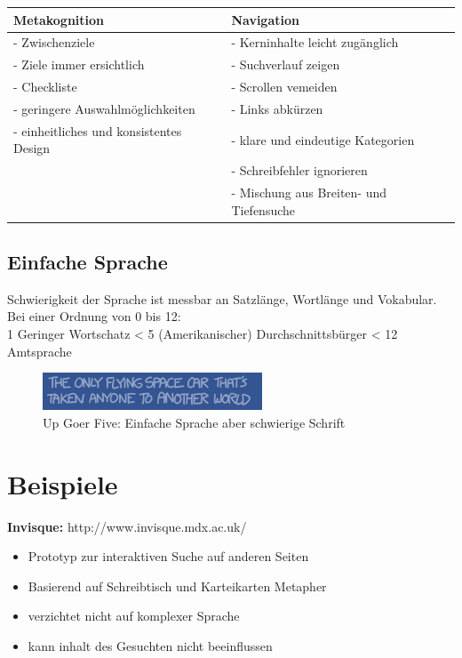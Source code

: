 \documentclass{handout}
\begin{document}
\begin{tabular}{| l | l |}
\hline
 Metakognition & Navigation\\
\hline
\hline
- Zwischenziele                        & - Kerninhalte leicht zugänglich\\
- Ziele immer ersichtlich &  - Suchverlauf zeigen\\
- Checkliste                     & - Scrollen vemeiden\\
 - geringere Auswahlmöglichkeiten& - Links abkürzen \\
 - einheitliches und konsistentes Design&  - klare und eindeutige Kategorien \\
& - Schreibfehler ignorieren \\
& - Mischung aus Breiten- und Tiefensuche \\
\hline
\end{tabular}
\subsection{Einfache Sprache}
Schwierigkeit der Sprache ist messbar an Satzlänge, Wortlänge und Vokabular.\\
Bei einer Ordnung von 0 bis 12:\\
1 Geringer Wortschatz < 5 (Amerikanischer) Durchschnittsbürger < 12 Amtsprache\\
\begin{figure}
		\centering
		\includegraphics[width=\textwidth]{up_goer_five_part.png}
	\caption{Up Goer Five: Einfache Sprache aber schwierige Schrift}
	\end{figure}

\section{Beispiele}

\textbf{Invisque:}	http://www.invisque.mdx.ac.uk/
	\begin{itemize}
		\item Prototyp zur interaktiven Suche auf anderen Seiten
		\item Basierend auf Schreibtisch und Karteikarten Metapher
                        \item verzichtet nicht auf komplexer Sprache
                        \item kann inhalt des Gesuchten nicht beeinflussen
	\end{itemize}
\end{document}
